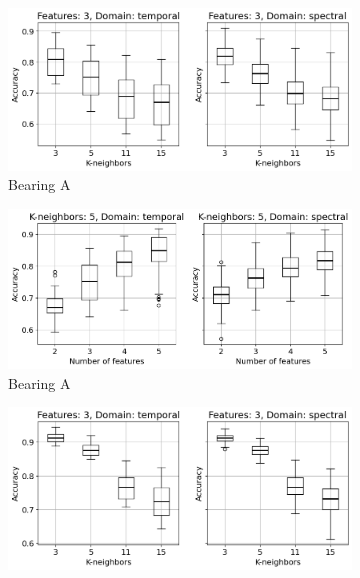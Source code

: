 \documentclass{llncs}
\begin{document}
\begin{figure}
	\centering
     \begin{subfigure}[b]{0.45\textwidth}
         \centering
         \includegraphics[width=\textwidth]{fig/combinations-mafaulda/all-axis-a-bearing-f3.png}
         \caption{Bearing A}
         \label{fig:all-models-bearings-f-3}
     \end{subfigure}
     \hfill
     \begin{subfigure}[b]{0.45\textwidth}
         \centering
         \includegraphics[width=\textwidth]{fig/combinations-mafaulda/all-axis-a-bearing-k5.png}
         \caption{Bearing A}
         \label{fig:all-models-bearings-k-5}
     \end{subfigure}
     \hfill
     \begin{subfigure}[b]{0.45\textwidth}
         \centering
         \includegraphics[width=\textwidth]{fig/combinations-mafaulda/all-axis-severity-f3.png}

\end{subfigure}
\end{figure}
\end{document}

